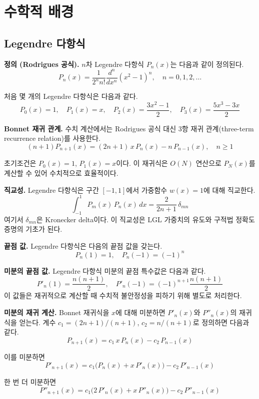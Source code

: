 \documentclass[11pt]{article}
\begin{document}
\section{수학적 배경}
\label{sec:math}

\subsection{Legendre 다항식}
\label{sec:legendre_poly}

\textbf{정의 (Rodrigues 공식).} $n$차 Legendre 다항식 $P_n(x)$는 다음과 같이 정의된다.
\[
P_n(x) = \frac{1}{2^n n!} \frac{d^n}{dx^n} (x^2 - 1)^n, \quad n = 0, 1, 2, \ldots
\]

처음 몇 개의 Legendre 다항식은 다음과 같다.
\[
P_0(x) = 1, \quad P_1(x) = x, \quad P_2(x) = \frac{3x^2 - 1}{2}, \quad P_3(x) = \frac{5x^3 - 3x}{2}
\]

\textbf{Bonnet 재귀 관계.} 수치 계산에서는 Rodrigues 공식 대신 3항 재귀 관계(three-term recurrence relation)를 사용한다.
\[
(n+1) P_{n+1}(x) = (2n+1)\, x\, P_n(x) - n\, P_{n-1}(x), \quad n \geq 1
\]

초기조건은 $P_0(x) = 1$, $P_1(x) = x$이다. 이 재귀식은 $O(N)$ 연산으로 $P_N(x)$를 계산할 수 있어 수치적으로 효율적이다.

\textbf{직교성.} Legendre 다항식은 구간 $[-1, 1]$에서 가중함수 $w(x) = 1$에 대해 직교한다.
\[
\int_{-1}^{1} P_m(x)\, P_n(x)\, dx = \frac{2}{2n+1}\, \delta_{mn}
\]
여기서 $\delta_{mn}$은 Kronecker delta이다. 이 직교성은 LGL 가중치의 유도와 구적법 정확도 증명의 기초가 된다.

\textbf{끝점 값.} Legendre 다항식은 다음의 끝점 값을 갖는다.
\[
P_n(1) = 1, \quad P_n(-1) = (-1)^n
\]

\textbf{미분의 끝점 값.} Legendre 다항식 미분의 끝점 특수값은 다음과 같다.
\[
P'_n(1) = \frac{n(n+1)}{2}, \quad P'_n(-1) = (-1)^{n+1} \frac{n(n+1)}{2}
\]
이 값들은 재귀적으로 계산할 때 수치적 불안정성을 피하기 위해 별도로 처리한다.

\textbf{미분의 재귀 계산.} Bonnet 재귀식을 $x$에 대해 미분하면 $P'_n(x)$와 $P''_n(x)$의 재귀식을 얻는다. 계수 $c_1 = (2n+1)/(n+1)$, $c_2 = n/(n+1)$로 정의하면 다음과 같다.
\[
P_{n+1}(x) = c_1\, x\, P_n(x) - c_2\, P_{n-1}(x)
\]

이를 미분하면
\[
P'_{n+1}(x) = c_1 \bigl( P_n(x) + x\, P'_n(x) \bigr) - c_2\, P'_{n-1}(x)
\]

한 번 더 미분하면
\[
P''_{n+1}(x) = c_1 \bigl( 2\, P'_n(x) + x\, P''_n(x) \bigr) - c_2\, P''_{n-1}(x)
\]
\end{document}
